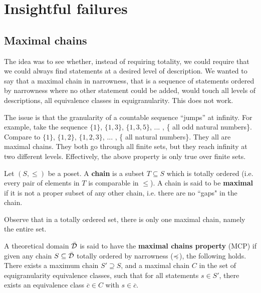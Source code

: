 \documentclass[11pt]{article}
\begin{document}
\section{Insightful failures}

\subsection{Maximal chains}

The idea was to see whether, instead of requiring totality, we could require that we could always find statements at a desired level of description. We wanted to say that a maximal chain in narrowness, that is a sequence of statements ordered by narrowness where no other statement could be added, would touch all levels of descriptions, all equivalence classes in equigranularity. This does not work.

The issue is that the granularity of a countable sequence ``jumps'' at infinity. For example, take the sequence $\{1\}$, $\{1, 3\}$, $\{1, 3, 5\}$, ... , \{ all odd natural numbers\}. Compare to $\{1\}$, $\{1, 2\}$, $\{1, 2, 3\}$, ... , \{ all natural numbers\}. They all are maximal chains. They both go through all finite sets, but they reach infinity at two different levels. Effectively, the above property is only true over finite sets.

\begin{defn}
Let $(S,\leq)$ be a poset. A \textbf{chain} is a subset $T\subseteq S$ which is totally ordered (i.e. every pair of elements in $T$ is comparable in $\leq$). A chain is said to be \textbf{maximal} if it is not a proper subset of any other chain, i.e. there are no ``gaps" in the chain. 
\end{defn}
Observe that in a totally ordered set, there is only one maximal chain, namely the entire set. 

\begin{defn}
A theoretical domain $\bar{\mathcal{D}}$ is said to have the \textbf{maximal chains property} (MCP) if given any chain $S\subseteq\bar{\mathcal{D}}$ totally ordered by narrowness ($\preccurlyeq$), the following holds. There exists a maximum chain $S'\supseteq S$, and a maximal chain $C$ in the set of equigranularity equivalence classes, such that for all statements $s \in S'$, there exists an equivalence class $\overline{c}\in C$ with $s\in \overline{c}$.
\end{defn}
\end{document}
